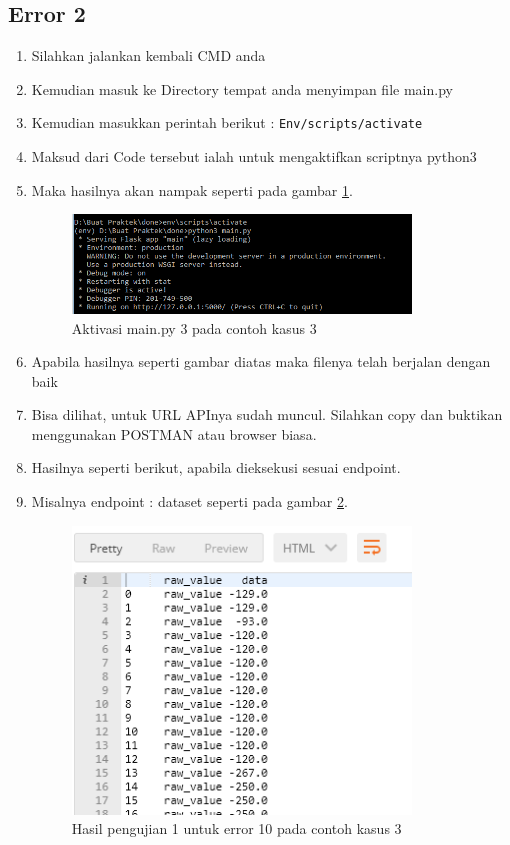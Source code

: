\subsection{Error 2}
\begin{enumerate}
\item Silahkan jalankan kembali CMD anda
\item Kemudian masuk ke Directory tempat anda menyimpan file main.py
\item Kemudian masukkan perintah berikut : \verb|Env/scripts/activate|
\item Maksud dari Code tersebut ialah untuk mengaktifkan scriptnya python3
\item Maka hasilnya akan nampak seperti pada gambar \ref{fig:am3}.
\begin{figure}[!htbp]
	\centerline{\includegraphics[width=0.85\textwidth]{figures/10/am3.PNG}}
	\caption{Aktivasi main.py 3 pada contoh kasus 3}
	\label{fig:am3}
\end{figure}

\item Apabila hasilnya seperti gambar diatas maka filenya telah berjalan dengan baik
\item Bisa dilihat, untuk URL APInya sudah muncul. Silahkan copy dan buktikan menggunakan POSTMAN atau browser biasa.
\item Hasilnya seperti berikut, apabila dieksekusi sesuai endpoint.
\item Misalnya endpoint : dataset seperti pada gambar \ref{fig:hu1}.
\begin{figure}[!htbp]
	\centerline{\includegraphics[width=0.85\textwidth]{figures/10/hu1.PNG}}
	\caption{Hasil pengujian 1 untuk error 10 pada contoh kasus 3}
	\label{fig:hu1}
\end{figure}


\end{enumerate}
